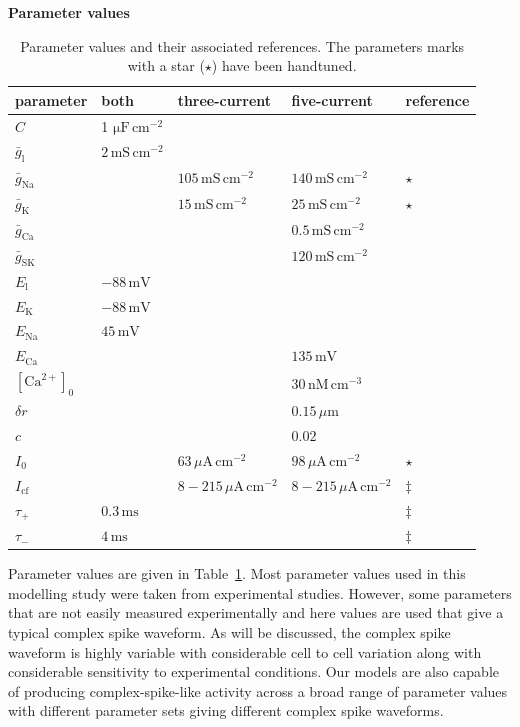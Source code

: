 \documentclass[twocolumn]{svjour3}          %
\newcommand{\mv}{\,\mathrm{mV}}
\newcommand{\msi}{\,\mathrm{mS\,cm^{-2}}}
\newcommand{\mse}{\,\mathrm{ms}}
\newcommand{\cm}{\,\mathrm{cm}}
\renewcommand{\k}{\mathrm{K}}
\newcommand{\ca}{\mathrm{Ca}}
\newcommand{\na}{\mathrm{Na}}
\newcommand{\sk}{\mathrm{SK}}
\newcommand{\leak}{\mathrm{l}}
\begin{document}
\begin{table}[!t]
\centering
\textbf{Parameter values}
\begin{center}
  \begin{tabular}{|l l l l l|}
\hline
parameter & both & three-current & five-current &reference \\ \hline
$C$&1 $\mathrm{\mu F}\,\mathrm{cm}^{-2}$&&& \citep{RothHausser2001}\\ \hline
$\bar{g}_\leak$&$2\msi$&&& \citep{RappEtAl1994}\\ \hline
$\bar{g}_\na$&&$105\msi$&$140\msi$&  $\star$\\ \hline
$\bar{g}_\k$&&$15\msi$&$25\msi$& $\star$  \\ \hline
$\bar{g}_\ca$&&& $0.5\msi$& \citep{MiyashoEtAl2001} \\ \hline
$\bar{g}_\sk$&&&$120\msi$& \citep{RubinCleland2006}\\ \hline
$E_\leak$&$-88\mv$&&& \citep{MasoliEtAl2015}\\ \hline
$E_\k$&$-88\mv$&&& \citep{MasoliEtAl2015}\\ \hline
$E_\na$&$45\mv$&&& \citep{DeSchutterBower1994a}\\ \hline
$E_\ca$&&&$135\mv$& \citep{DeSchutterBower1994a}\\ \hline
$[\ca^{2+}]_0$&&&$30\, \mathrm{nM}\cm^{-3}$& \citep{KanoEtAl1995}\\ \hline
$\delta r$&&&$0.15\,\mu\mathrm{m}$& \\ \hline
$c$&&&$0.02$& \\ \hline
$I_0$&&$63\,\mu\mathrm{A}\cm^{-2}$&$98\,\mu\mathrm{A}\cm^{-2}$& $\star$\\ \hline
$I_{\mathrm{cf}}$&&$8-215\,\mu\mathrm{A}\cm^{-2}$&$8-215\,\mu\mathrm{A}\cm^{-2}$& $\ddagger$\citep{StuartHausser1994}\\ \hline
$\tau_+$&$0.3\mse$&&&  $\ddagger$\citep{StuartHausser1994}\\ \hline
$\tau_-$&$4\mse$&&& $\ddagger$\citep{StuartHausser1994}\\ \hline
\end{tabular}
\end{center}
\caption{Parameter values and their associated references. The
  parameters marks with a star ($\star$) have been handtuned.}
\label{table1}
\end{table}

Parameter values are given in Table~\ref{table1}. Most parameter
values used in this modelling study were taken from experimental
studies. However, some parameters that are not easily measured
experimentally and here values are used that give a typical complex
spike waveform. As will be discussed, the complex spike waveform is
highly variable with considerable cell to cell variation along with
considerable sensitivity to experimental conditions. Our models are
also capable of producing complex-spike-like activity across a broad
range of parameter values with different parameter sets giving
different complex spike waveforms.
\end{document}
